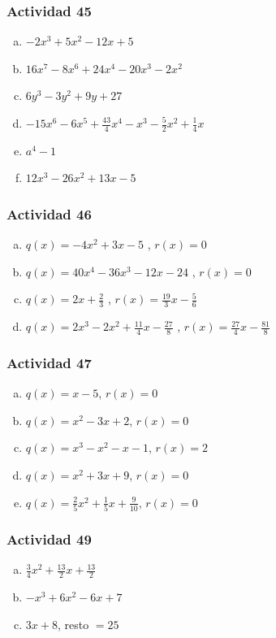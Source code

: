 \documentclass[a4paper, twocolumn]{article}
\begin{document}
\subsubsection*{Actividad 45}
\begin{enumerate}[a)]
\item $-2x^3 + 5x^2 - 12x +5$
\item $16x^7 - 8x^6 +24x^4 - 20x^3 -2x^2$
\item $6y^3 - 3y^2 + 9y + 27$
\item $-15x^6 -6x^5 + \frac{43}{4}x^4-x^3-\frac{5}{2}x^2 + \frac{1}{4}x$
\item $a^4 - 1$
\item $12x^3 -26x^2 + 13x -5$
\end{enumerate}

\subsubsection*{Actividad 46}
\begin{enumerate}[a)]
\item $q(x) = -4x^2 + 3x -5$ , $r(x)=0$
\item $q(x) = 40x^4 -36x^3 -12x -24$ , $r(x)=0$
\item $q(x) = 2x+\frac{2}{3}$ , $r(x)=\frac{19}{3}x - \frac{5}{6}$
\item $q(x) = 2x^3 -2x^2 +\frac{11}{4}x-\frac{27}{8}$ , $r(x) = \frac{27}{4}x -\frac{81}{8}$
\end{enumerate}

\subsubsection*{Actividad 47}
\begin{enumerate}[a)]
\item $q(x) = x - 5$, $r(x) = 0 $
\item $q(x) = x^2 -3x +2$, $r(x) = 0$
\item $q(x) = x^3 - x^2 - x -1$, $r(x)=2$
\item $q(x) = x^2 + 3x + 9$, $r(x)=0$
\item $q(x) = \frac{2}{5}x^2+\frac{1}{5}x+\frac{9}{10}$, $r(x)=0$

\end{enumerate}

\subsubsection*{Actividad 49}
\begin{enumerate}[a)]
\item $\frac{3}{4}x^2 + \frac{13}{2}x+\frac{13}{2}$
\item $-x^3 + 6x^2 -6x +7$
\item $3x + 8$, resto $=25$
\end{enumerate}
\end{document}
